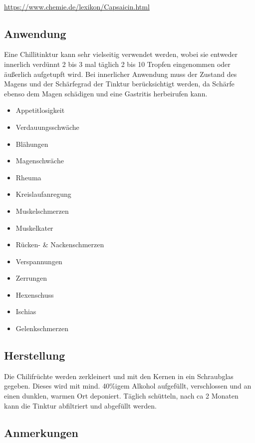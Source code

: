 \cite{tinkturen}  ~\cite{heilkraeuterlexikon}

\url{https://www.chemie.de/lexikon/Capsaicin.html}

\subsection{Anwendung}

Eine Chillitinktur kann sehr vielseitig verwendet werden, wobei sie entweder innerlich verdünnt 2 bis 3  mal täglich 2 bis 10 Tropfen eingenommen oder äußerlich aufgetupft wird. Bei innerlicher Anwendung muss der Zustand des Magens und der Schärfegrad der Tinktur berücksichtigt werden, da Schärfe ebenso dem Magen schädigen und eine Gastritis herbeirufen kann. 

\begin{itemize}
	\item Appetitlosigkeit
	\item Verdauungsschwäche
	\item Blähungen
	\item Magenschwäche
	\item Rheuma
	\item Kreislaufanregung
	\item Muskelschmerzen
	\item Muskelkater
	\item Rücken- \& Nackenschmerzen
	\item Verspannungen
	\item Zerrungen
	\item Hexenschuss
	\item Ischias
	\item Gelenkschmerzen
\end{itemize}

\subsection{Herstellung}

Die Chilifrüchte werden zerkleinert und mit den Kernen in ein Schraubglas gegeben. Dieses wird mit mind. 40\%igem Alkohol aufgefüllt, verschlossen und an einen dunklen, warmen Ort deponiert. Täglich schütteln, nach ca 2 Monaten kann die Tinktur abfiltriert und abgefüllt werden.

\subsection{Anmerkungen}







